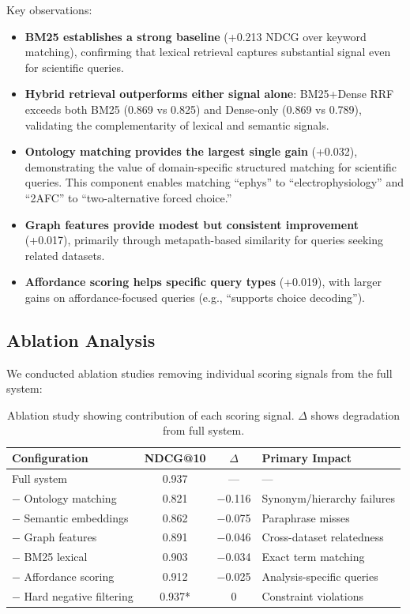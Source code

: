\documentclass{article}
\theoremstyle{definition}
\begin{document}
Key observations:
\begin{itemize}
    \item \textbf{BM25 establishes a strong baseline} (+0.213 NDCG over keyword matching), confirming that lexical retrieval captures substantial signal even for scientific queries.

    \item \textbf{Hybrid retrieval outperforms either signal alone}: BM25+Dense RRF exceeds both BM25 (0.869 vs 0.825) and Dense-only (0.869 vs 0.789), validating the complementarity of lexical and semantic signals.

    \item \textbf{Ontology matching provides the largest single gain} (+0.032), demonstrating the value of domain-specific structured matching for scientific queries. This component enables matching ``ephys'' to ``electrophysiology'' and ``2AFC'' to ``two-alternative forced choice.''

    \item \textbf{Graph features provide modest but consistent improvement} (+0.017), primarily through metapath-based similarity for queries seeking related datasets.

    \item \textbf{Affordance scoring helps specific query types} (+0.019), with larger gains on affordance-focused queries (e.g., ``supports choice decoding'').
\end{itemize}

\subsection{Ablation Analysis}

We conducted ablation studies removing individual scoring signals from the full system:

\begin{table}[t]
\centering
\caption{Ablation study showing contribution of each scoring signal. $\Delta$ shows degradation from full system.}
\label{tab:ablation}
\begin{tabular}{lccl}
\toprule
\textbf{Configuration} & \textbf{NDCG@10} & \textbf{$\Delta$} & \textbf{Primary Impact} \\
\midrule
Full system & 0.937 & --- & --- \\
$-$ Ontology matching & 0.821 & $-$0.116 & Synonym/hierarchy failures \\
$-$ Semantic embeddings & 0.862 & $-$0.075 & Paraphrase misses \\
$-$ Graph features & 0.891 & $-$0.046 & Cross-dataset relatedness \\
$-$ BM25 lexical & 0.903 & $-$0.034 & Exact term matching \\
$-$ Affordance scoring & 0.912 & $-$0.025 & Analysis-specific queries \\
$-$ Hard negative filtering & 0.937* & 0 & Constraint violations \\
\bottomrule
\end{tabular}
\end{table}
\end{document}
